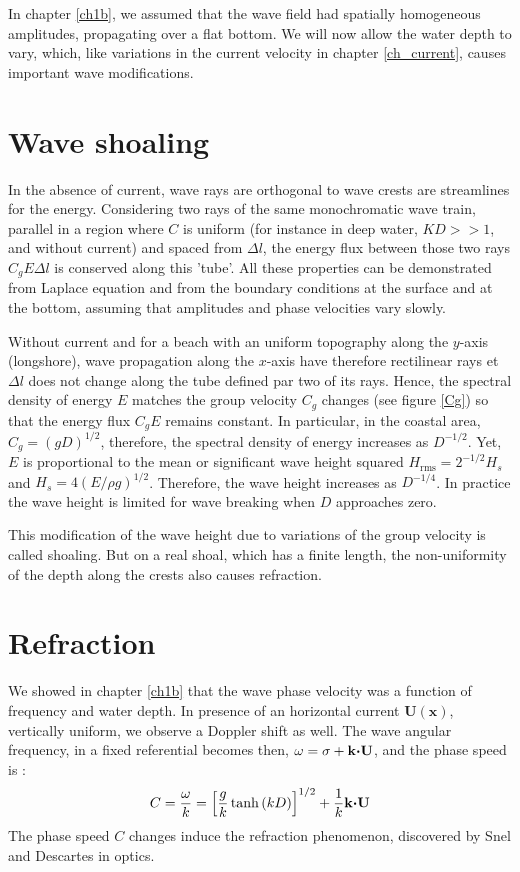 In chapter \ref{ch1b}, we assumed that the wave field had spatially homogeneous amplitudes, propagating over a flat bottom. 
We will now allow the water depth to vary, which, like variations in the current velocity in chapter \ref{ch_current}, causes important 
wave modifications. 

\section{Wave shoaling}
In the absence of current, wave rays are orthogonal to wave crests are streamlines for the energy.
Considering two rays of the same monochromatic wave train, parallel in a
region where $C$ is uniform (for instance in deep water, $KD>>1$, and without
current) and spaced from $\Delta l$, the energy flux between those two rays
 $C_g E \Delta l$ is conserved along this 'tube'. All these properties can be
 demonstrated from Laplace equation and from the boundary conditions at the surface
 and at the bottom, assuming that amplitudes and phase velocities vary slowly.


Without current and for a beach with an uniform topography along the $y$-axis 
(longshore), wave propagation along the $x$-axis have therefore rectilinear
rays et $\Delta l$ does not change along the tube defined par two of its rays.
Hence, the spectral density of energy $E$ matches the group velocity $C_g$ changes
(see figure \ref{Cg}) so that the energy flux $C_g E$ remains constant.
In particular, in the coastal area, $C_g=\left(gD\right)^{1/2}$, therefore,
the spectral density of energy increases as $D^{-1/2}$. Yet, $E$ is proportional
to the mean or significant wave height squared $H_{\mathrm{rms}}=2^{-1/2} H_s$ and
$H_s=4 \left(E/\rho g\right)^{1/2}$. Therefore, the wave height increases as
$D^{-1/4}$. In practice the wave height is limited for wave breaking when  $D$ approaches zero. 

This modification of the wave height due to variations of the group velocity is called 
shoaling.  But on a real shoal, which has a finite length, the non-uniformity of the depth along the crests 
also causes refraction. 

\section{Refraction}

We showed in chapter \ref{ch1b} that the wave phase velocity was a
function of frequency and water depth. In presence of an horizontal current
${\mathbf U}({\mathbf x})$, vertically uniform, we observe a Doppler
shift as well. The wave angular frequency, in a fixed referential becomes
then, $\omega=\sigma+{\mathbf k}\mbox{\boldmath $\cdot$}{\mathbf U}$,  and the phase speed 
is :
\begin{equation}
    C=\frac{\omega}{k}
    = \left[ \frac{g}{k} \tanh \left(k D \right) \right]^{1/2}
    +\frac{1}{k}{\mathbf k}\mbox{\boldmath $\cdot$}{\mathbf U}
\end{equation}
The phase speed $C$ changes induce the refraction phenomenon, discovered
by Snel and Descartes in optics.


